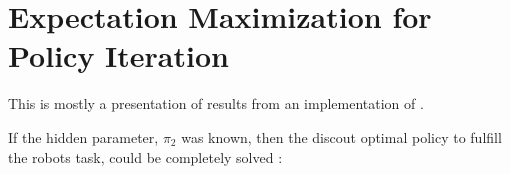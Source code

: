 \chapter{Expectation Maximization for Policy Iteration}\label{chapt:policy_iteration}
        This is mostly a presentation of results from an implementation of \cite{toussaint2010expectation}.

        If the hidden parameter, $\pi_2$ was known, then the discout optimal policy to fulfill the robots task,
         could be completely solved \cite{hernandez2012adaptive}:
